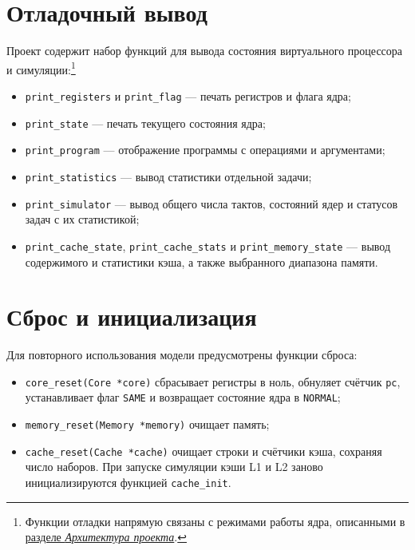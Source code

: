 \documentclass[12pt,a4paper]{article}
\begin{document}
\section{Отладочный вывод}\label{sec:debug}

Проект содержит набор функций для вывода состояния виртуального процессора и симуляции:\footnote{Функции отладки напрямую связаны с режимами работы ядра, описанными в \hyperref[sec:architecture]{разделе \textit{Архитектура проекта}}.}

\begin{itemize}[leftmargin=1.5em]
    \item \texttt{print\_registers} и \texttt{print\_flag} --- печать регистров и флага ядра;
    \item \texttt{print\_state} --- печать текущего состояния ядра;
    \item \texttt{print\_program} --- отображение программы с операциями и аргументами;
    \item \texttt{print\_statistics} --- вывод статистики отдельной задачи;
    \item \texttt{print\_simulator} --- вывод общего числа тактов, состояний ядер и статусов задач с их статистикой;
    \item \texttt{print\_cache\_state}, \texttt{print\_cache\_stats} и \texttt{print\_memory\_state} --- вывод содержимого и статистики кэша, а также выбранного диапазона памяти.
\end{itemize}


\section{Сброс и инициализация}\label{sec:reset}

Для повторного использования модели предусмотрены функции сброса:

\begin{itemize}[leftmargin=1.5em]
    \item \texttt{core\_reset(Core *core)} сбрасывает регистры в ноль, обнуляет счётчик \texttt{pc}, устанавливает флаг \texttt{SAME} и возвращает состояние ядра в \texttt{NORMAL};
    \item \texttt{memory\_reset(Memory *memory)} очищает память;
    \item \texttt{cache\_reset(Cache *cache)} очищает строки и счётчики кэша, сохраняя число наборов. При запуске симуляции кэши L1 и L2 заново инициализируются функцией \texttt{cache\_init}.
\end{itemize}
\end{document}

